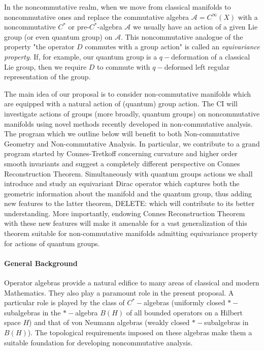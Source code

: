 \documentclass{article}
\begin{document}
In the noncommutative realm, when we move from classical manifolds to noncommutative ones and replace the commutative algebra $\mathcal{A}=C^{\infty}(X)$ with a noncommutative $C^*$ or pre-$C^*$-algebra $\mathcal{A}$ we usually have an action of a given Lie group (or even quantum group) on $\mathcal{A}.$ This noncommutative analogue of the property "the operator $D$ commutes with a group action" is called an {\it equivariance property}. If, for example, our quantum group is a $q-$deformation of a classical Lie group, then we require $D$ to commute with $q-$deformed left regular representation of the group.


The main idea of our proposal is to consider non-commutative manifolds {\color{blue} which are equipped with a }natural action of (quantum) group action. The CI will investigate actions of groups (more broadly, quantum groups) on noncommutative manifolds using novel methods recently developed in non-commutative analysis. The program which we outline below will benefit to both Non-commutative Geometry and Non-commutative Analysis. In particular, we contribute to a grand program started by Connes-Tretkoff \cite{ConnesTretkoff} concerning curvature and higher order smooth invariants and suggest a completely different perspective on Connes Reconstruction Theorem. Simultaneously with quantum groups actions we shall introduce and study an equivariant Dirac operator which captures both the geometric information about the manifold and the quantum group, thus adding new features to the latter theorem,{\color{red} DELETE: which will contribute to its better understanding}. More importantly, endowing Connes Reconstruction Theorem with these new features will make it amenable for a vast generalization of this theorem suitable for non-commutative manifolds admitting equivariance property for actions of quantum groups.

\paragraph*{General Background}

Operator algebras provide a natural edifice to many areas of classical and modern Mathematics. They also play a paramount role in the present proposal. A particular role is played by the class of $C^{\ast}-$algebras (uniformly closed $\ast-$subalgebras in the $\ast-$algebra $B(H)$  of all bounded operators on a Hilbert space $H$) and that of von Neumann algebras (weakly closed $\ast-$subalgebras in $B(H)$). The topological requirements imposed on these algebras make them a suitable foundation for developing noncommutative analysis. 
\end{document}
